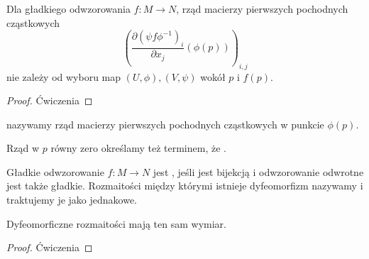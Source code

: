 \begin{fact}
    Dla gładkiego odwzorowania $f:M\to N$, rząd macierzy pierwszych pochodnych cząstkowych 
    $$\left(\frac{\partial(\psi f\phi^{-1})_i}{\partial x_j}(\phi(p))\right)_{i,j}$$ 
    nie zależy od wyboru map $(U,\phi),(V,\psi)$ wokół $p$ i $f(p)$.
\end{fact}
\begin{proof}Ćwiczenia\end{proof}

\begin{definition}
 nazywamy rząd macierzy pierwszych pochodnych cząstkowych w punkcie $\phi(p)$.

Rząd w $p$ równy zero określamy też terminem, że .
\end{definition}

\begin{definition}[dyfeomorfizm]
    Gładkie odwzorowanie $f:M\to N$ jest , jeśli jest bijekcją i odwzorowanie odwrotne jest także gładkie. Rozmaitości między którymi istnieje dyfeomorfizm nazywamy  i traktujemy je jako jednakowe.
\end{definition}

\begin{fact}
    Dyfeomorficzne rozmaitości mają ten sam wymiar.
\end{fact}
\begin{proof}Ćwiczenia
\end{proof}

